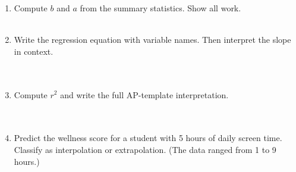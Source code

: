 \documentclass[10pt]{article}
\begin{document}
\begin{tcolorbox}[colback=goldbg, colframe=black!40, boxrule=0.7pt, arc=2mm,
    left=4mm, right=4mm, top=2.5mm, bottom=2.5mm,
    title={\textbf{Tier A --- Approaching Proficiency}}, fonttitle=\bfseries]
\small

\begin{enumerate}[leftmargin=1.6em, itemsep=0.16in]
  \item Compute $b$ and $a$ from the summary statistics. Show all work.\\[8pt]
        \writeline\\[3pt]\writeline

  \item Write the regression equation with variable names. Then interpret the slope in context.\\[8pt]
        \writeline\\[3pt]\writeline\\[3pt]\writeline

  \item Compute $r^2$ and write the full AP-template interpretation.\\[8pt]
        \writeline\\[3pt]\writeline\\[3pt]\writeline

  \item Predict the wellness score for a student with 5 hours of daily screen time. Classify
        as interpolation or extrapolation. (The data ranged from 1 to 9 hours.)\\[8pt]
        \writeline\\[3pt]\writeline
\end{enumerate}
\end{tcolorbox}

\vspace{0.12in}
\end{document}
